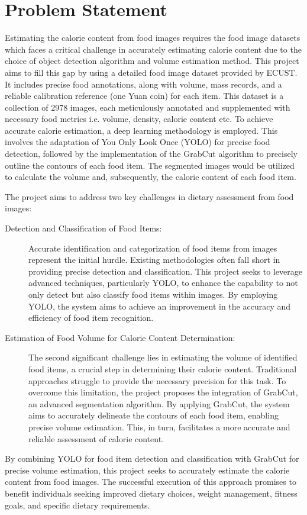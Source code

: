 \documentclass[12pt, a4paper, twoside]{article}
\begin{document}
	\section{Problem Statement}
	Estimating the calorie content from food images requires the food image datasets which faces a critical challenge in accurately estimating calorie content due to the choice of object detection algorithm and volume estimation method. This project aims to fill this gap by using a detailed food image dataset provided by ECUST\cite{liang}. It includes precise food annotations, along with volume, mass records, and a reliable calibration reference (one Yuan coin) for each item. This dataset is a collection of 2978 images, each meticulously annotated and supplemented with necessary food metrics i.e. volume, density, calorie content etc. To achieve accurate calorie estimation, a deep learning methodology is employed. This involves the adaptation of You Only Look Once (YOLO) for precise food detection, followed by the implementation of the GrabCut algorithm to precisely outline the contours of each food item. The segmented images would be utilized to calculate the volume and, subsequently, the calorie content of each food item.
	\par
	The project aims to address two key challenges in dietary assessment from food images:
	\begin{description}
		\item[Detection and Classification of Food Items:] Accurate identification and categorization of food items from images represent the initial hurdle. Existing methodologies often fall short in providing precise detection and classification. This project seeks to leverage advanced techniques, particularly YOLO, to enhance the capability to not only detect but also classify food items within images. By employing YOLO, the system aims to achieve an improvement in the accuracy and efficiency of food item recognition.
		
		\item[Estimation of Food Volume for Calorie Content Determination:] 
		The second significant challenge lies in estimating the volume of identified food items, a crucial step in determining their calorie content. Traditional approaches struggle to provide the necessary precision for this task. To overcome this limitation, the project proposes the integration of GrabCut, an advanced segmentation algorithm. By applying GrabCut, the system aims to accurately delineate the contours of each food item, enabling precise volume estimation. This, in turn, facilitates a more accurate and reliable assessment of calorie content.
	\end{description}
	\par
	By combining YOLO for food item detection and classification with GrabCut for precise volume estimation, this project seeks to accurately estimate the calorie content from food images. The successful execution of this approach promises to benefit individuals seeking improved dietary choices, weight management, fitness goals, and specific dietary requirements.
	
\end{document}
